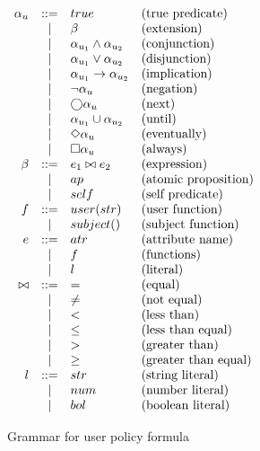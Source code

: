 \begin{table}[!ht]
    \centering
    $
    \begin{array}{rcll}
        \alpha_u   & ::=   & true              & \text{(true predicate)} \\
                & |     & \beta              & \text{(extension)} \\
                & |     & \alpha_{u_1} \land \alpha_{u_2} & \text{(conjunction)} \\
                & |     & \alpha_{u_1} \lor \alpha_{u_2}  & \text{(disjunction)} \\
                & |     & \alpha_{u_1} \rightarrow \alpha_{u_2} & \text{(implication)} \\
                & |     & \neg \alpha_u          & \text{(negation)} \\
                & |     & \bigcirc \alpha_u            & \text{(next)} \\
                & |     & \alpha_{u_1} \cup \alpha_{u_2}    & \text{(until)} \\
                & |     & \Diamond \alpha_u            & \text{(eventually)} \\
                & |     & \square \alpha_u            & \text{(always)} \\
        \beta    & ::=   & e_1 \bowtie e_2   & \text{(expression)} \\
                & |     & ap                & \text{(atomic proposition)} \\
                & |     & self              & \text{(self predicate)} \\
        f       & ::=   & user(str)           & \text{(user function)} \\
                & |     & subject()         & \text{(subject function)} \\
        e       & ::=   & atr               & \text{(attribute name)} \\
                & |     & f                 & \text{(functions)} \\
                & |     & l                 & \text{(literal)} \\
        \bowtie & ::=   & =                 & \text{(equal)} \\
                & |     & \neq              & \text{(not equal)} \\
                & |     & <                 & \text{(less than)} \\
                & |     & \leq              & \text{(less than equal)} \\
                & |     & >                 & \text{(greater than)} \\
                & |     & \geq              & \text{(greater than equal)} \\
        l       & ::=   & str               & \text{(string literal)} \\
                & |     & num               & \text{(number literal)} \\
                & |     & bol               & \text{(boolean literal)} \\
    \end{array}
    $
    \caption{Grammar for user policy formula}
    \label{tab:pf-grammar-user}
\end{table}